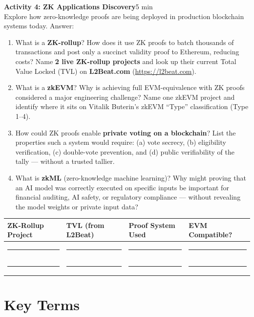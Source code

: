\documentclass[11pt,a4paper]{article}
\newcommand{\activitybox}[3]{%
  \noindent\colorbox{mllavender4}{\parbox{\dimexpr\linewidth-2\fboxsep}{%
    \textbf{\color{mlpurple}#1}\hfill\textcolor{mlgray}{\small #2}\\[2pt]#3%
  }}\par\vspace{4pt}%
}
\newcommand{\fillcell}{\rule{2.2cm}{0.3pt}}
\begin{document}
\activitybox{Activity 4: ZK Applications Discovery}{5 min}{%
Explore how zero-knowledge proofs are being deployed in production blockchain systems today. Answer:
\begin{enumerate}
\item What is a \textbf{ZK-rollup}? How does it use ZK proofs to batch thousands of transactions and post only a succinct validity proof to Ethereum, reducing costs? Name \textbf{2 live ZK-rollup projects} and look up their current Total Value Locked (TVL) on \textbf{L2Beat.com} (\url{https://l2beat.com}).
\item What is a \textbf{zkEVM}? Why is achieving full EVM-equivalence with ZK proofs considered a major engineering challenge? Name one zkEVM project and identify where it sits on Vitalik Buterin's zkEVM ``Type'' classification (Type 1--4).
\item How could ZK proofs enable \textbf{private voting on a blockchain}? List the properties such a system would require: (a) vote secrecy, (b) eligibility verification, (c) double-vote prevention, and (d) public verifiability of the tally --- without a trusted tallier.
\item What is \textbf{zkML} (zero-knowledge machine learning)? Why might proving that an AI model was correctly executed on specific inputs be important for financial auditing, AI safety, or regulatory compliance --- without revealing the model weights or private input data?
\end{enumerate}
\vspace{4pt}
{\footnotesize\renewcommand{\arraystretch}{1.35}%
\setlength{\tabcolsep}{5pt}%
\begin{tabular}{@{}p{3.5cm}p{3.0cm}p{3.0cm}p{4.0cm}@{}}
\toprule
\textbf{ZK-Rollup Project} & \textbf{TVL (from L2Beat)} & \textbf{Proof System Used} & \textbf{EVM Compatible?} \\
\midrule
\fillcell & \fillcell & \fillcell & \fillcell \\
\fillcell & \fillcell & \fillcell & \fillcell \\
\bottomrule
\end{tabular}}
\vspace{2pt}
}

\vspace{4pt}

\section{Key Terms}
\end{document}
